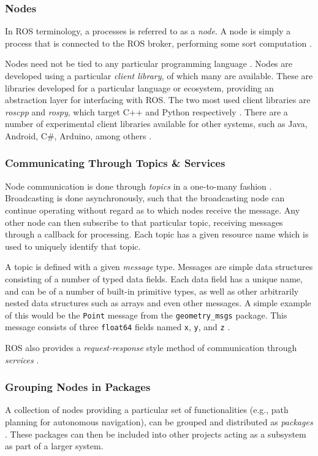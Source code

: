 \subsubsection{Nodes}
In ROS terminology, a processes is referred to as a \emph{node}. A node is simply a process that is connected to the ROS broker, performing some sort computation \cite{ros_paper}.

Nodes need not be tied to any particular programming language \cite{ros_paper}. Nodes are developed using a particular \emph{client library}, of which many are available. These are libraries developed for a particular language or ecosystem, providing an abstraction layer for interfacing with ROS. The two most used client libraries are \emph{roscpp} and \emph{rospy}, which target C++ and Python respectively \cite{ros_wiki_clientlibraries}. There are a number of experimental client libraries available for other systems, such as Java, Android, C\#, Arduino, among others \cite{ros_wiki_clientlibraries}.

\subsubsection{Communicating Through Topics \& Services}
Node communication is done through \emph{topics} in a one-to-many fashion \cite{ros_paper}. Broadcasting is done asynchronously, such that the broadcasting node can continue operating without regard as to which nodes receive the message. Any other node can then subscribe to that particular topic, receiving messages through a callback for processing. Each topic has a given resource name which is used to uniquely identify that topic.

A topic is defined with a given \emph{message} type. Messages are simple data structures consisting of a number of typed data fields. Each data field has a unique name, and can be of a number of built-in primitive types, as well as other arbitrarily nested data structures such as arrays and even other messages. A simple example of this would be the \texttt{Point} message from the \texttt{geometry\_msgs} package. This message consists of three \texttt{float64} fields named \texttt{x}, \texttt{y}, and \texttt{z} \cite{ros_api_point_msg}.

ROS also provides a \emph{request-response} style method of communication through \emph{services} \cite{ros_wiki_services}.

\subsubsection{Grouping Nodes in Packages}
A collection of nodes providing a particular set of functionalities (e.g., path planning for autonomous navigation), can be grouped and distributed as \emph{packages} \cite{ros_paper}. These packages can then be included into other projects acting as a subsystem as part of a larger system.

